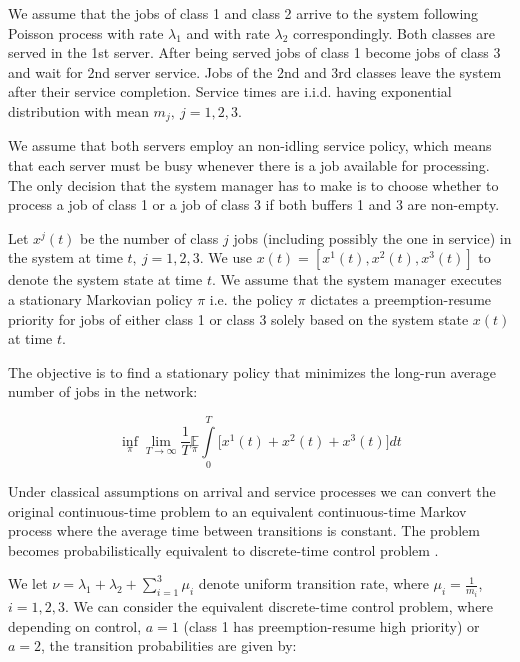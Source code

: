 \documentclass[11pt]{article}
\newcommand{\E}{\mathbb{E}}
\theoremstyle{definition}
\numberwithin{equation}{section}
\begin{document}
 We assume that the jobs of class 1 and class 2 arrive to the system following Poisson process with rate $\lambda_1$ and with rate $\lambda_2$ correspondingly. Both classes are served in the 1st server. After being served jobs of class 1 become jobs of class 3 and wait for 2nd server service. Jobs of the 2nd and 3rd classes leave the system after their service completion.
Service times are i.i.d. having exponential distribution with mean $m_j,~ j = 1, 2, 3$.



We assume that both servers employ an non-idling service policy, which means that each
server must be busy whenever there is a job available for processing. The only decision that the system manager has to make is to choose whether to process a job of class 1  or a job of class
3 if both buffers 1 and 3 are non-empty.

Let $x^j(t)$ be the number of class $j$ jobs (including possibly the one in service) in the system  at
time $t,~j = 1, 2, 3$.  We use $x(t) = \left[x^1(t), x^2(t), x^3(t)\right]$ to denote the system state at time $t$. We assume that the system manager executes a stationary Markovian policy $\pi$ i.e. the policy $\pi$ dictates a preemption-resume priority for jobs of either class 1 or class 3 solely based on the system state $x(t)$ at time $t$.


 The objective is to find a stationary policy that minimizes the long-run average number
of jobs in the network:

\begin{equation}\label{co}
\inf\limits_{\pi} \lim\limits_{T\rightarrow \infty} \frac{1}{T} \underset{\pi}{\E} \int\limits_0^T\Big[x^1(t)+x^2(t)+x^3(t)\Big]dt
\end{equation}

Under classical assumptions on arrival and service processes we can convert the original continuous-time problem to  an equivalent continuous-time Markov process where the average time between
transitions is constant. The problem becomes  probabilistically equivalent to   discrete-time control
problem \cite{Lippman1975}.


 We let $\nu = \lambda_1+\lambda_2 + \sum\limits_{i=1}^3 \mu_i$  denote uniform transition rate, where $\mu_i = \frac{1}{m_i}$, $i=1, 2, 3$. We can consider the equivalent discrete-time control
problem, where depending on control, $a = 1$ (class 1 has preemption-resume high priority) or $a = 2$, the transition probabilities are given by:
\end{document}
